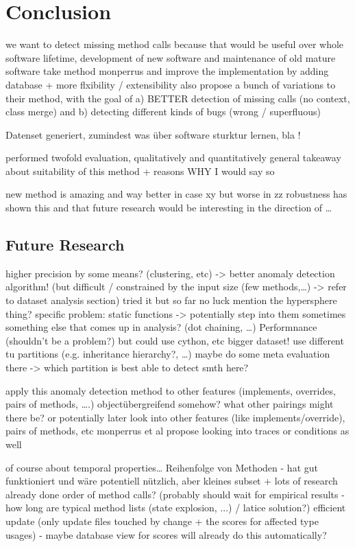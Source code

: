 \chapter{Conclusion}\label{ch:concl}

we want to detect missing method calls
because that would be useful over whole software lifetime, development of new software and maintenance of old mature software
take method monperrus and improve the implementation by adding database + more flxibility / extensibility
also propose a bunch of variations to their method, with the goal of a) BETTER detection of missing calls (no context, class merge)
and b) detecting different kinds of bugs (wrong / superfluous)

Datenset generiert, zumindest was über software sturktur lernen, bla !

performed twofold evaluation, qualitatively and quantitatively
general takeaway about suitability of this method + reasons WHY I would say so

new method is amazing and way better in case xy but worse in zz
robustness has shown this and that
future research would be interesting in the direction of \ldots

\section{Future Research}

higher precision by some means? (clustering, etc)
-> better anomaly detection algorithm! (but difficult / constrained by the input size (few methods,\ldots) -> refer to dataset analysis section)
    tried it but so far no luck
    mention the hypersphere thing?
specific problem: static functions -> potentially step into them sometimes
something else that comes up in analysis? (dot chaining, \ldots)
Performnance (shouldn't be a problem?)
    but could use cython, etc
bigger dataset!
use different tu partitions (e.g. inheritance hierarchy?, \ldots)
    maybe do some meta evaluation there -> which partition is best able to detect smth here?

apply this anomaly detection method to other features (implements, overrides, pairs of methods, \ldots.)
    objectübergreifend somehow?
    what other pairings might there be?
or potentially later look into other features (like implements/override), pairs of methods, etc
monperrus et al propose looking into traces or conditions as well

of course about temporal properties\ldots
Reihenfolge von Methoden - hat gut funktioniert und wäre potentiell nützlich, aber kleines subset + lots of research already done
order of method calls? (probably should wait for empirical results - how long are typical method lists (state explosion, ...) / latice solution?)
efficient update (only update files touched by change + the scores for affected type usages) - maybe database view for scores will already do this automatically? 


